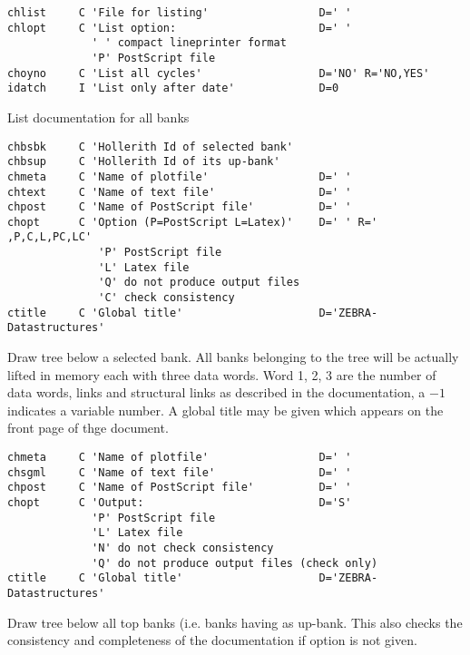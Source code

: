 \begin{verbatim}
chlist     C 'File for listing'                 D=' '
chlopt     C 'List option:                      D=' '
             ' ' compact lineprinter format
             'P' PostScript file
choyno     C 'List all cycles'                  D='NO' R='NO,YES'
idatch     I 'List only after date'             D=0
\end{verbatim}
 
List documentation for all banks
 
 
\begin{verbatim}
chbsbk     C 'Hollerith Id of selected bank'
chbsup     C 'Hollerith Id of its up-bank'
chmeta     C 'Name of plotfile'                 D=' '
chtext     C 'Name of text file'                D=' '
chpost     C 'Name of PostScript file'          D=' '
chopt      C 'Option (P=PostScript L=Latex)'    D=' ' R=' ,P,C,L,PC,LC'
              'P' PostScript file
              'L' Latex file
              'Q' do not produce output files
              'C' check consistency
ctitle     C 'Global title'                     D='ZEBRA-Datastructures'
\end{verbatim}
 
Draw tree below a selected bank. 
All banks belonging to the tree will be
actually lifted in memory each with three data words. 
Word 1, 2, 3 are the number of data words, links and structural links
as described in the documentation, a $-1$ indicates a variable number.
A global title may be given which appears on the front page of
thge document.
 
\newpage

 
\begin{verbatim}
chmeta     C 'Name of plotfile'                 D=' '
chsgml     C 'Name of text file'                D=' '
chpost     C 'Name of PostScript file'          D=' '
chopt      C 'Output:                           D='S'
             'P' PostScript file
             'L' Latex file
             'N' do not check consistency
             'Q' do not produce output files (check only)
ctitle     C 'Global title'                     D='ZEBRA-Datastructures'
\end{verbatim}
 
Draw tree below all top banks (i.e. banks having  as
up-bank. This also checks the consistency and completeness
of the documentation if option  is not given.
 
